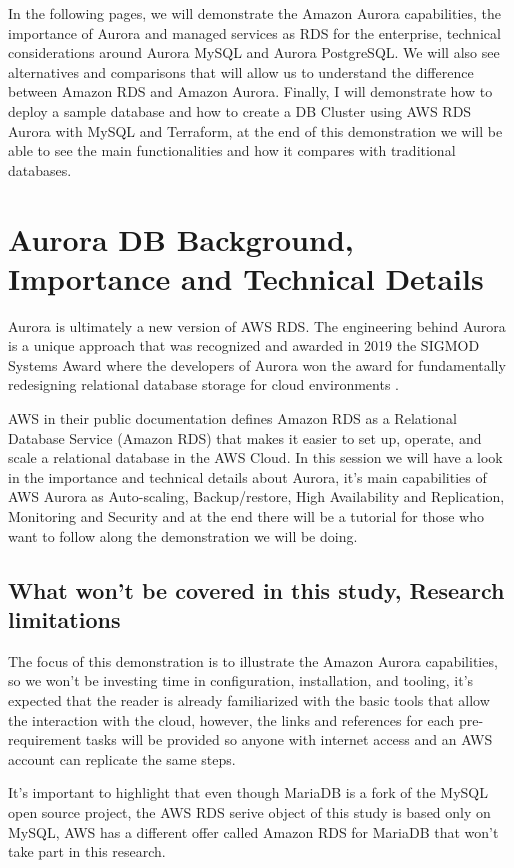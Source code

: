 \documentclass{article}
\begin{document}
In the following pages, we will demonstrate the Amazon Aurora capabilities, the importance of Aurora and managed services as RDS for the enterprise, technical considerations around Aurora MySQL and Aurora PostgreSQL.  We will also see alternatives and comparisons that will allow us to understand the difference between Amazon RDS and Amazon Aurora. Finally, I will demonstrate how to deploy a sample database and how to create a DB Cluster using AWS RDS Aurora with MySQL and Terraform, at the end of this demonstration we will be able to see the main functionalities and how it compares with traditional databases.

\section {Aurora DB Background, Importance and Technical Details}

Aurora is ultimately a new version of AWS RDS. The engineering behind Aurora is a unique approach that was recognized and awarded in 2019 the SIGMOD Systems Award where the developers of Aurora won the award for fundamentally redesigning relational database storage for cloud environments \cite{sigmod2021}. 

AWS in their public documentation defines Amazon RDS as a Relational Database Service (Amazon RDS) that makes it easier to set up, operate, and scale a relational database in the AWS Cloud. In this session we will have a look in the importance and technical details about Aurora, it's main capabilities of AWS Aurora as Auto-scaling, Backup/restore, High Availability and Replication, Monitoring and Security and at the end there will be a tutorial for those who want to follow along the demonstration we will be doing. 

\subsection{What won't be covered in this study, Research limitations}

The focus of this demonstration is to illustrate the Amazon Aurora capabilities, so we won’t be investing time in configuration, installation, and tooling, it’s expected that the reader is already familiarized with the basic tools that allow the interaction with the cloud, however, the links and references for each pre-requirement tasks will be provided so anyone with internet access and an AWS account can replicate the same steps.

It's important to highlight that even though MariaDB is a fork of the MySQL open source project, the AWS RDS serive object of this study is based only on MySQL, AWS has a different offer called Amazon RDS for MariaDB that won't take part in this research. 
\end{document}
